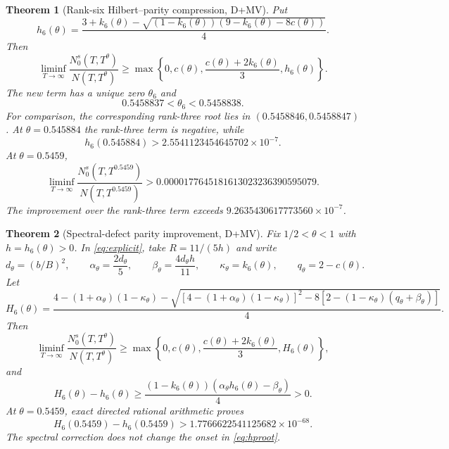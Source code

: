 ﻿\documentclass[11pt]{article}
\newtheorem{theorem}{Theorem}[section]
\theoremstyle{remark}
\begin{document}
\begin{theorem}[Rank-six Hilbert--parity compression, D+MV]
\label{thm:hilbertparity}
Put
\[
 h_6(\theta)=\frac{3+k_6(\theta)-
 \sqrt{(1-k_6(\theta))(9-k_6(\theta)-8c(\theta))}}4.
\]
Then
\begin{equation}\label{eq:hilbertsimple}
 \liminf_{T\to\infty}\frac{N_0^s(T,T^\theta)}{N(T,T^\theta)}
 \ge\max\left\{0,c(\theta),\frac{c(\theta)+2k_6(\theta)}3,
 h_6(\theta)\right\}.
\end{equation}
The new term has a unique zero $\theta_6$ and
\begin{equation}\label{eq:hproot}
 0.5458837<\theta_6<0.5458838.
\end{equation}
For comparison, the corresponding rank-three root lies in
$(0.5458846,0.5458847)$. At $\theta=0.545884$ the rank-three term is negative,
while
\begin{equation}\label{eq:hpedge}
 h_6(0.545884)>2.5541123454645702\times10^{-7}.
\end{equation}
At $\theta=0.5459$,
\begin{equation}\label{eq:hppoint}
 \liminf_{T\to\infty}\frac{N_0^s(T,T^{0.5459})}{N(T,T^{0.5459})}
 >0.0000177645181613023236390595079.
\end{equation}
The improvement over the rank-three term exceeds
$9.2635430617773560\times10^{-7}$.
\end{theorem}

\begin{theorem}[Spectral-defect parity improvement, D+MV]
\label{thm:defectparity}
Fix $1/2<\theta<1$ with $h=h_6(\theta)>0$. In \eqref{eq:explicit}, take
$R=11/(5h)$ and write
\[
 d_\theta=(b/B)^2,\qquad
 \alpha_\theta=\frac{2d_\theta}{5},\qquad
 \beta_\theta=\frac{4d_\theta h}{11},\qquad
 \kappa_\theta=k_6(\theta),\qquad q_\theta=2-c(\theta).
\]
Let
\begin{equation}\label{eq:defectroot}
 H_6(\theta)=\frac{4-(1+\alpha_\theta)(1-\kappa_\theta)
 -\sqrt{[4-(1+\alpha_\theta)(1-\kappa_\theta)]^2
 -8[2-(1-\kappa_\theta)(q_\theta+\beta_\theta)]}}{4}.
\end{equation}
Then
\begin{equation}\label{eq:defectsimple}
 \liminf_{T\to\infty}\frac{N_0^s(T,T^\theta)}{N(T,T^\theta)}
 \ge\max\left\{0,c(\theta),\frac{c(\theta)+2k_6(\theta)}3,
 H_6(\theta)\right\},
\end{equation}
and
\begin{equation}\label{eq:defectstrict}
 H_6(\theta)-h_6(\theta)\ge
 \frac{(1-k_6(\theta))(\alpha_\theta h_6(\theta)-\beta_\theta)}4>0.
\end{equation}
At $\theta=0.5459$, exact directed rational arithmetic proves
\begin{equation}\label{eq:defectpoint}
 H_6(0.5459)-h_6(0.5459)>
 1.7766622541125682\times10^{-68}.
\end{equation}
The spectral correction does not change the onset in \eqref{eq:hproot}.
\end{theorem}
\end{document}

